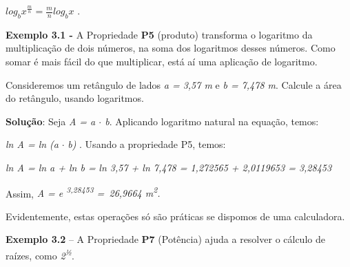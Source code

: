 \documentclass[12pt]{article}
\begin{document}
\begin{enumerate}[label*={\fontsize{14pt}{14pt}\selectfont \textbf{\arabic*.}}]
\begin{justify}
\tab   \( log_{b}x^{\frac{m}{n}}=\frac{m}{n}log_{b}x \) .
\end{justify}\par


\vspace{\baselineskip}
\begin{justify}
\textbf{Exemplo 3.1 - }A Propriedade \textbf{P5} (produto) transforma o logaritmo da multiplicação de dois números, na soma dos logaritmos desses números. Como somar é mais fácil do que multiplicar, está aí uma aplicação de logaritmo.
\end{justify}\par

\begin{justify}
Consideremos um retângulo de lados \textit{a = 3,57 m} e \textit{b = 7,478 m}. Calcule a área do retângulo, usando logaritmos.
\end{justify}\par

\begin{justify}
\textbf{Solução}: Seja \textit{A = a $ \cdot $  b}. Aplicando logaritmo natural na equação, temos:
\end{justify}\par

\begin{justify}
\textit{ln A = ln (a }$ \cdot $  \textit{b)} . Usando a propriedade P5, temos:
\end{justify}\par

\begin{justify}
\textit{ln A = ln a + ln b =} \textit{ln 3,57 + ln 7,478 = 1,272565 + 2,0119653 = 3,28453}
\end{justify}\par

\begin{justify}
Assim, \textit{ A = e \textsuperscript{3,28453 }=\  26,9664 m\textsuperscript{2}.}
\end{justify}\par

\begin{justify}
Evidentemente, estas operações só são práticas se dispomos de uma calculadora.
\end{justify}\par


\vspace{\baselineskip}
\begin{justify}
\textbf{Exemplo 3.2} – A Propriedade \textbf{P7} (Potência) ajuda a resolver o cálculo de raízes, como \textit{2\textsuperscript{½}}.
\end{justify}\par


\end{enumerate}
\end{document}
